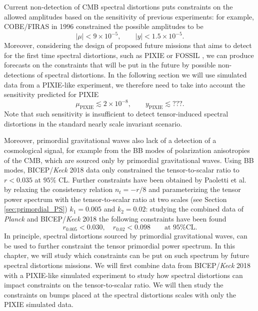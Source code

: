 \label{chap:constr}
Current non-detection of CMB spectral distortions puts constraints on the allowed amplitudes based on the sensitivity of previous experiments: for example, COBE/FIRAS \cite{COBE1996} in 1996 constrained the possible amplitudes to be 
\begin{equation}
    |\mu|<9\times10^{-5}, \qquad  |y|<1.5\times 10^{-5}.
\end{equation}
Moreover, considering the design of proposed future missions that aims to detect for the first time spectral distortions, such as PIXIE \cite{pixie,A_Kogut_2011} or FOSSIL \cite{IAS_Fossil}, we can produce forecasts on the constraints that will be put in the future by possible non-detections of spectral distortions. In the following section we will use simulated data from a PIXIE-like experiment, we therefore need to take into account the sensitivity predicted for PIXIE
\begin{equation}
    \label{eq:pix_sens} \mu_\text{PIXIE}\lesssim 2\times10^{-8}, \qquad y_\text{PIXIE}\lesssim???.
\end{equation}
Note that such sensitivity is insufficient to detect tensor-induced spectral distortions in the standard nearly scale invariant scenario.

Moreover, primordial gravitational waves also lack of a detection of a cosmological signal, for example from the BB modes of polarization anisotropies of the CMB, which are sourced only by primordial gravitational waves. Using BB modes, BICEP/\textit{Keck} 2018 data \cite{Ade_2021} only constrained the  tensor-to-scalar ratio to $r<0.035$ at $95\%$ CL. Further constraints have been obtained by Paoletti et al. \cite{Paoletti_2022} by relaxing the consistency relation $n_t=-r/8$ and parameterizing the tensor power spectrum with the tensor-to-scalar ratio at two scales (see  Section \ref{sec:primordial_PS}) $k_1=0.005$ and $k_2=0.02$: studying the combined data of \textit{Planck} \cite{planck2018results} and BICEP/\textit{Keck} 2018 \cite{Ade_2021} the following constraints have been found
\begin{equation}
    r_{0.005}<0.030,\quad r_{0.02}<0.098\qquad\text{at 95\% CL.}
\end{equation}
In principle, spectral distortions sourced by primordial gravitational waves, can be used to further constraint the tensor primordial power spectrum. In this chapter, we will study which constraints can be put on such spectrum by future spectral distortions missions. We will first combine data from BICEP/\textit{Keck} 2018 with a PIXIE-like simulated experiment to study how spectral distortions can impact constraints on the tensor-to-scalar ratio. We will then study the constraints on bumps placed at the spectral distortions scales with only the PIXIE simulated data.

